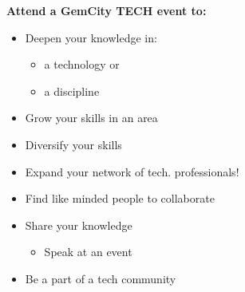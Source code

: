 \documentclass[
  letterpaper,
  DIV=11,
  numbers=noendperiod]{scrartcl}
\providecommand{\tightlist}{%
  \setlength{\itemsep}{0pt}\setlength{\parskip}{0pt}}\usepackage{longtable,booktabs,array}
\begin{document}
\vspace{-.25\baselineskip}

\begin{figure}

\begin{minipage}[t]{0.60\linewidth}

{\centering 

\textbf{\Large Attend a GemCity TECH event to:}

\begin{itemize}
\tightlist
\item
  Deepen your knowledge in:

  \begin{itemize}
  \tightlist
  \item
    a technology or
  \item
    a discipline
  \end{itemize}
\item
  Grow your skills in an area
\item
  Diversify your skills
\item
  Expand your network of tech. professionals!
\item
  Find like minded people to collaborate
\item
  Share your knowledge

  \begin{itemize}
  \tightlist
  \item
    Speak at an event
  \end{itemize}
\item
  Be a part of a tech community
\end{itemize}

}

\end{minipage}%
%
\begin{minipage}[t]{0.05\linewidth}

{\centering 

~

}

\end{minipage}%
%
\begin{minipage}[t]{0.25\linewidth}

{\centering 

\vspace{-2.15\baselineskip}

}
\end{minipage}
\end{figure}
\end{document}
